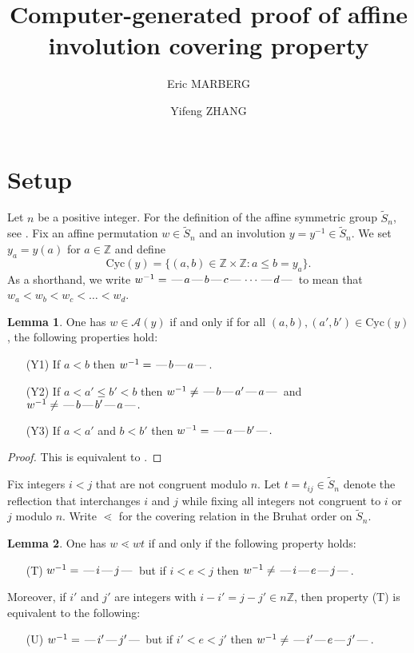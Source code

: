 \documentclass[10pt]{article}
\theoremstyle{definition}
\theoremstyle{definition}
\newtheorem{lemma}{Lemma}
\def\dash{\text{\hspace{0.5mm}---\hspace{0.5mm}}}
\def\Cyc{\mathrm{Cyc}}
\def\ZZ{\mathbb{Z}}
\begin{document}
\title{Computer-generated proof of affine involution covering property}
\author{Eric MARBERG \and Yifeng ZHANG}
\maketitle
\tableofcontents

\section{Setup}

Let $n$ be a positive integer.
For the definition of the affine symmetric group $\tilde S_n$, see \cite{M}.
Fix an affine permutation $w \in \tilde S_n$ and an involution $y =y^{-1} \in\tilde S_n$.
We set $y_a = y(a)$ for $a \in \ZZ$ and define
\[\Cyc(y) = \{ (a,b) \in \ZZ\times\ZZ : a \leq b = y_a\}.\]
As a shorthand, we write $w^{-1} = \dash a\dash b\dash c \dash \cdots\dash d \dash$
to mean that $w_a < w_b < w_c < \dots < w_d$.

\begin{lemma}\label{lem-1}
One has $w \in \mathcal{A}(y)$
if and only if for all $(a,b),(a',b') \in \Cyc(y)$, the following properties hold:
\begin{enumerate}
\item[(Y1)] If $a < b$ then $w^{-1} = \dash b \dash a \dash$.
\item[(Y2)] If $a < a' \leq b' < b$ then $w^{-1} \neq \dash b \dash a' \dash a \dash$
and $w^{-1}\neq \dash b \dash b' \dash a \dash.$
\item[(Y3)] If $a < a'$ and $b < b'$ then $w^{-1} = \dash a \dash b' \dash.$
\end{enumerate}
\end{lemma}

\begin{proof}
This is equivalent to \cite[Theorem 7.6]{M}.
\end{proof}

Fix integers $i < j$ that are not congruent modulo $n$.
Let $t=t_{ij} \in \tilde S_n$ denote the reflection
that interchanges $i$ and $j$ while fixing all integers not congruent to
$i$ or $j$ modulo $n$.
Write $\lessdot$ for the covering relation in the Bruhat order on $\tilde S_n$.

\begin{lemma}
One has $w \lessdot wt$
if and only if the following property holds:
\begin{enumerate}
\item[(T)] $w^{-1} = \dash i \dash j \dash$ but if $i<e<j$
then $w^{-1} \neq \dash i \dash e \dash j\dash$.
\end{enumerate}
Moreover, if $i'$ and $j'$ are integers with $i-i' = j-j' \in n\ZZ$,
then property (T) is equivalent to the following:
\begin{enumerate}
\item[(U)] $w^{-1} = \dash i' \dash j' \dash$ but if $i'<e<j'$
then $w^{-1} \neq \dash i' \dash e \dash j'\dash$.
\end{enumerate}
\end{lemma}
\end{document}
